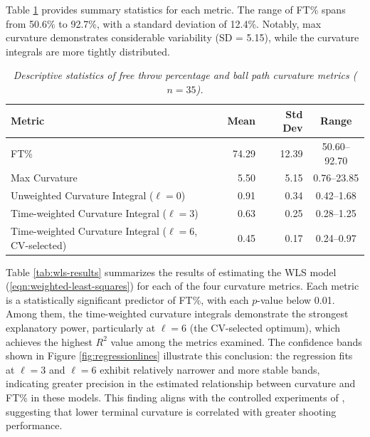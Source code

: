 \documentclass[Review,sageh,times,doublespace]{sagej}
\begin{document}
    Table \ref{tab:summary-stats} provides summary statistics for each metric. The range of FT\% spans from 50.6\% to 92.7\%, with a standard deviation of 12.4\%. Notably, max curvature demonstrates considerable variability (SD = 5.15), while the curvature integrals are more tightly distributed.

    \begin{table}
        \centering
        \begin{tabular}{lrrc}
        \toprule
        \textbf{Metric} & \textbf{Mean} & \textbf{Std Dev} & \textbf{Range} \\
        \midrule
        FT\% & 74.29 & 12.39 & 50.60--92.70 \\
        Max Curvature & 5.50 & 5.15 & 0.76--23.85 \\
        Unweighted Curvature Integral ($\ell=0$) & 0.91 & 0.34 & 0.42--1.68 \\
        Time-weighted Curvature Integral ($\ell=3$) & 0.63 & 0.25 & 0.28--1.25 \\
        Time-weighted Curvature Integral ($\ell=6$, CV-selected) & 0.45 & 0.17 & 0.24--0.97 \\ %
        \bottomrule
        \end{tabular}
        \caption{\it Descriptive statistics of free throw percentage and ball path curvature metrics ($n = 35$).}
        \label{tab:summary-stats}
    \end{table}

    Table \ref{tab:wls-results} summarizes the results of estimating the WLS model (\ref{eqn:weighted-least-squares}) for each of the four curvature metrics. Each metric is a statistically significant predictor of FT\%, with each $p$-value below 0.01. Among them, the time-weighted curvature integrals demonstrate the strongest explanatory power, particularly at $\ell = 6$ (the CV-selected optimum), which achieves the highest $R^2$ value among the metrics examined. The confidence bands shown in Figure \ref{fig:regressionlines} illustrate this conclusion: the regression fits at $\ell = 3$ and $\ell = 6$ exhibit relatively narrower and more stable bands, indicating greater precision in the estimated relationship between curvature and FT\% in these models. This finding aligns with the controlled experiments of \citet{slegers_role_2024}, suggesting that lower terminal curvature is correlated with greater shooting performance.
\end{document}
